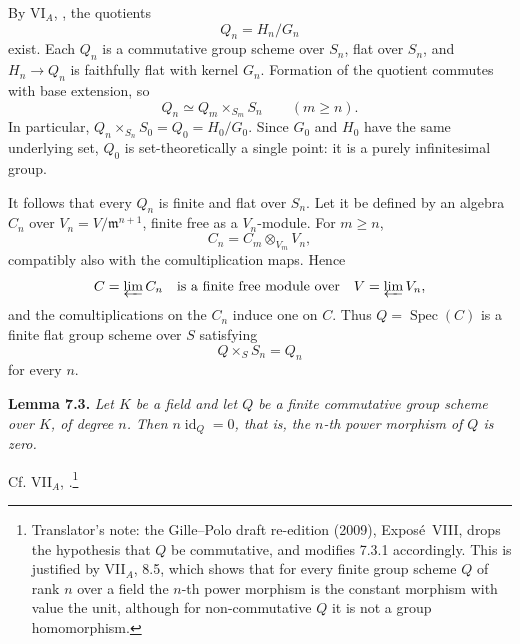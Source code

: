 By VI\(_A\), , the quotients
\[
  Q_n=H_n/G_n
\]
exist. Each \(Q_n\) is a commutative group scheme over \(S_n\), flat over
\(S_n\), and \(H_n\to Q_n\) is faithfully flat with kernel \(G_n\).
Formation of the quotient commutes with base extension, so
\[
  Q_n\simeq Q_m\times_{S_m}S_n\qquad(m\geq n).
\]
In particular, \(Q_n\times_{S_n}S_0=Q_0=H_0/G_0\). Since \(G_0\) and
\(H_0\) have the same underlying set, \(Q_0\) is set-theoretically a single
point: it is a purely infinitesimal group.

It follows that every \(Q_n\) is finite and flat over \(S_n\). Let it be
defined by an algebra \(C_n\) over \(V_n=V/\mathfrak m^{n+1}\), finite free
as a \(V_n\)-module. For \(m\geq n\),
\[
  C_n=C_m\otimes_{V_m}V_n,
\]
compatibly also with the comultiplication maps. Hence
\[
  C=\varprojlim C_n
  \quad\text{is a finite free module over}\quad
  V=\varprojlim V_n,
\]
and the comultiplications on the \(C_n\) induce one on \(C\). Thus
\(Q=\operatorname{Spec}(C)\) is a finite flat group scheme over \(S\)
satisfying
\[
  Q\times_SS_n=Q_n
\]
for every \(n\).

\medskip
\noindent{}\textbf{Lemma 7.3.}
\textit{Let \(K\) be a field and let \(Q\) be a finite commutative group
scheme over \(K\), of degree \(n\). Then \(n\operatorname{id}_Q=0\), that
is, the \(n\)-th power morphism of \(Q\) is zero.}

Cf. VII\(_A\), .\footnote{Translator's note: the Gille--Polo
draft re-edition (2009), Expos\'e~VIII, drops the hypothesis that \(Q\) be commutative, and modifies
7.3.1 accordingly. This is justified by VII\(_A\), 8.5, which shows that for every finite group
scheme \(Q\) of rank \(n\) over a field the \(n\)-th power morphism is the constant morphism with
value the unit, although for non-commutative \(Q\) it is not a group homomorphism.}

